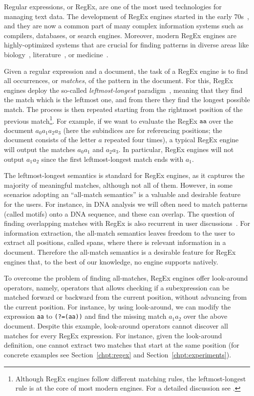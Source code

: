 
Regular expressions, or RegEx, are one of the most used technologies for
managing text data. The development of RegEx engines started in the early
70s~\cite{thompson1968programming,earlyNFA}, and they are now a common part of
many complex information systems such as compilers, databases, or search
engines. Moreover, modern RegEx engines are highly-optimized systems that are
crucial for finding patterns in diverse areas like biology~\cite{Gonzalo},
literature~\cite{lit1}, or medicine~\cite{FloresFP21}. 


Given a regular expression and a document, the task of a RegEx engine is to find
all occurrences, or \emph{matches}, of the pattern in the document. For this,
RegEx engines deploy the so-called \emph{leftmost-longest}
paradigm~\cite{posix}, meaning that they find the match which is the leftmost
one, and from there they find the longest possible match. The process is then
repeated  starting from the rightmost position of the previous
match\footnote{Although RegEx engines follow different matching rules, the
leftmost-longest rule is at the core of most modern engines. For a detailed
discussion see \cite{friedl2006mastering}.}. For example, if we want to evaluate
the RegEx $\texttt{aa}$ over the document $a_0 a_1 a_2 a_3$ (here the subindices
are for referencing positions; the document consists of the letter $a$ repeated
four times), a typical RegEx engine will output the matches $a_0a_1$ and
$a_2a_3$. In particular, RegEx engines will not output $a_1a_2$ since the first
leftmost-longest match ends with $a_1$. 

The leftmost-longest semantics is standard for  RegEx engines, as it captures
the majority of meaningful matches, although not all of them. However, in some
scenarios adopting an ``all-match semantics'' is a valuable and desirable
feature for the users. For instance, in DNA analysis we will often need to match
patterns (called motifs) onto a DNA sequence, and these can overlap. The
question of finding overlapping matches with RegEx is also recurrent in user
discussions~\cite{overlap1,overlap2,overlap3}. For information extraction, the
all-match semantics leaves freedom to the user to extract all positions, called
spans, where there is relevant information in a document. Therefore the
all-match semantics is a desirable feature for RegEx engines that, to the best
of our knowledge, no engine supports natively.

To overcome the problem of finding all-matches, RegEx engines offer look-around
operators, namely, operators that allows checking if a subexpression can be
matched forward or backward from the current position, without advancing from
the current position. For instance, by using look-around, we can modify the
expression \texttt{aa} to \texttt{(?=(aa))} and find the missing match $a_1a_2$
over the above document. Despite this example, look-around operators cannot
discover all matches for every RegEx expression. For instance, given the
look-around definition, one cannot extract two matches that start at the same
position (for concrete examples see Section~\ref{chpt:regex} and
Section~\ref{chpt:experiments}).


